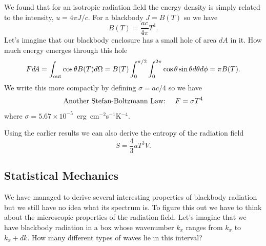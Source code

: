 We found that for an isotropic radiation field the energy density is 
simply related to the intensity, $u = 4\pi J/c$.  For a blackbody
$J=B(T)$ so we have
\begin{equation}
B(T) = \frac{a c}{4\pi} T^4.
\label{eq:26}
\end{equation}
Let's imagine that our blackbody enclosure has a small hole of area
$d\!A$ in it. How much energy emerges through this hole
\begin{equation}
F d\!A = \int_{\hbox{\rm \scriptsize out}} \cos\theta B(T) d \Omega
 = B(T) \int_0^{\pi/2} \int_0^{2\pi} \cos\theta \sin\theta d\theta d\phi =
 \pi B(T).
\label{eq:27}
\end{equation}
We write this more compactly by defining $\sigma=ac/4$ so we have
\begin{equation}
\hbox{\rm Another Stefan-Boltzmann Law:}~~~~F=\sigma T^4
\label{eq:793}
\end{equation}
where $\sigma = 5.67 \times
10^{-5}$~erg~cm$^{-2}$s$^{-1}$K$^{-4}$. 

Using the earlier results we can also derive the entropy of the 
radiation field
\begin{equation}
S = \frac{4}{3} a T^3 V.
\label{eq:28}
\end{equation}

\subsection{Statistical Mechanics}
\label{sec:stat-mech}

We have managed to derive several interesting properties of blackbody
radiation but we still have no idea what its spectrum is.  To figure
this out we have to think about the microscopic properties of the
radiation field.  Let's imagine that we have blackbody radiation in a
box whose wavenumber $k_x$ ranges from $k_x$ to $k_x + dk$.  How many
different types of waves lie in this interval?

